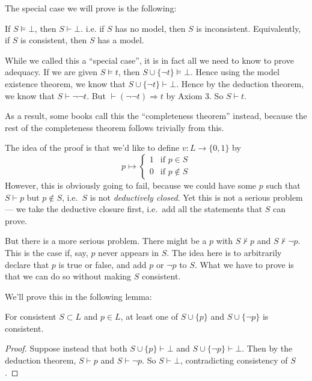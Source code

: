\documentclass[a4paper]{article}
\begin{document}
The special case we will prove is the following:
\begin{thm}
  If $S\models \bot$, then $S\vdash \bot$. i.e. if $S$ has no model, then $S$ is inconsistent. Equivalently, if $S$ is consistent, then $S$ has a model.

\end{thm}

While we called this a ``special case'', it is in fact all we need to know to prove adequacy. If we are given $S\models t$, then $S\cup \{\neg t\} \models \bot$. Hence using the model existence theorem, we know that $S\cup \{\neg t\} \vdash \bot$. Hence by the deduction theorem, we know that $S\vdash \neg \neg t$. But $\vdash (\neg\neg t)\Rightarrow t$ by Axiom 3. So $S\vdash t$.

As a result, some books call this the ``completeness theorem'' instead, because the rest of the completeness theorem follows trivially from this.

The idea of the proof is that we'd like to define $v: L \to \{0, 1\}$ by
\[
  p\mapsto
  \begin{cases}
    1 & \text{if } p\in S\\
    0 & \text{if } p\not\in S
  \end{cases}
\]
However, this is obviously going to fail, because we could have some $p$ such that $S\vdash p$ but $p\not\in S$, i.e.\ $S$ is not \emph{deductively closed}. Yet this is not a serious problem --- we take the deductive closure first, i.e.\ add all the statements that $S$ can prove.

But there is a more serious problem. There might be a $p$ with $S\not\vdash p$ and $S\not\vdash \neg p$. This is the case if, say, $p$ never appears in $S$. The idea here is to arbitrarily declare that $p$ is true or false, and add $p$ or $\neg p$ to $S$. What we have to prove is that we can do so without making $S$ consistent.

We'll prove this in the following lemma:
\begin{lemma}
  For consistent $S\subset L$ and $p\in L$, at least one of $S\cup \{p\}$ and $S\cup \{\neg p\}$ is consistent.
\end{lemma}

\begin{proof}
  Suppose instead that both $S\cup \{p\} \vdash \bot$ and $S\cup \{\neg p\}\vdash \bot$. Then by the deduction theorem, $S\vdash p$ and $S\vdash \neg p$. So $S\vdash \bot$, contradicting consistency of $S$.
\end{proof}
\end{document}
